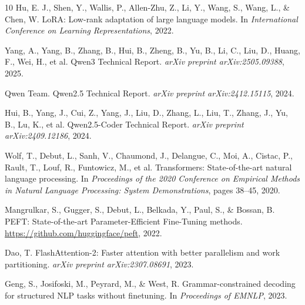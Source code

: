 \documentclass[11pt,a4paper]{article}
\begin{document}
\begin{thebibliography}{10}
Hu, E. J., Shen, Y., Wallis, P., Allen-Zhu, Z., Li, Y., Wang, S., Wang, L., \& Chen, W.
\newblock LoRA: Low-rank adaptation of large language models.
\newblock In \textit{International Conference on Learning Representations}, 2022.


Yang, A., Yang, B., Zhang, B., Hui, B., Zheng, B., Yu, B., Li, C., Liu, D., Huang, F., Wei, H., et al.
\newblock Qwen3 Technical Report.
\newblock \textit{arXiv preprint arXiv:2505.09388}, 2025.

Qwen Team.
\newblock Qwen2.5 Technical Report.
\newblock \textit{arXiv preprint arXiv:2412.15115}, 2024.

Hui, B., Yang, J., Cui, Z., Yang, J., Liu, D., Zhang, L., Liu, T., Zhang, J., Yu, B., Lu, K., et al.
\newblock Qwen2.5-Coder Technical Report.
\newblock \textit{arXiv preprint arXiv:2409.12186}, 2024.


Wolf, T., Debut, L., Sanh, V., Chaumond, J., Delangue, C., Moi, A., Cistac, P., Rault, T., Louf, R., Funtowicz, M., et al.
\newblock Transformers: State-of-the-art natural language processing.
\newblock In \textit{Proceedings of the 2020 Conference on Empirical Methods in Natural Language Processing: System Demonstrations}, pages 38--45, 2020.

Mangrulkar, S., Gugger, S., Debut, L., Belkada, Y., Paul, S., \& Bossan, B.
\newblock PEFT: State-of-the-art Parameter-Efficient Fine-Tuning methods.
\newblock \url{https://github.com/huggingface/peft}, 2022.

Dao, T.
\newblock FlashAttention-2: Faster attention with better parallelism and work partitioning.
\newblock \textit{arXiv preprint arXiv:2307.08691}, 2023.


Geng, S., Josifoski, M., Peyrard, M., \& West, R.
\newblock Grammar-constrained decoding for structured NLP tasks without finetuning.
\newblock In \textit{Proceedings of EMNLP}, 2023.



\end{thebibliography}
\end{document}
